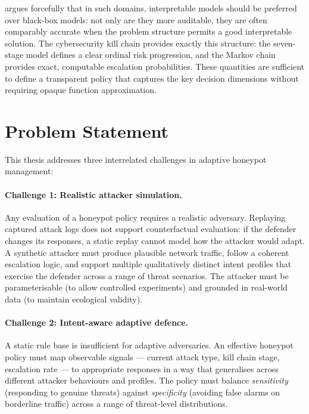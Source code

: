 \citet{rudin2019stop} argues forcefully that in such domains, interpretable
models should be preferred over black-box models: not only are they more
auditable, they are often comparably accurate when the problem structure
permits a good interpretable solution.
The cybersecurity kill chain provides exactly this structure: the seven-stage
model defines a clear ordinal risk progression, and the Markov chain provides
exact, computable escalation probabilities.
These quantities are sufficient to define a transparent policy that captures
the key decision dimensions without requiring opaque function approximation.

\section{Problem Statement}

This thesis addresses three interrelated challenges in adaptive honeypot
management:

\paragraph{Challenge 1: Realistic attacker simulation.}
Any evaluation of a honeypot policy requires a realistic adversary.
Replaying captured attack logs does not support counterfactual evaluation:
if the defender changes its responses, a static replay cannot model how the
attacker would adapt.
A synthetic attacker must produce plausible network traffic, follow a coherent
escalation logic, and support multiple qualitatively distinct intent profiles
that exercise the defender across a range of threat scenarios.
The attacker must be parameterisable (to allow controlled experiments) and
grounded in real-world data (to maintain ecological validity).

\paragraph{Challenge 2: Intent-aware adaptive defence.}
A static rule base is insufficient for adaptive adversaries.
An effective honeypot policy must map observable signals --- current attack
type, kill chain stage, escalation rate --- to appropriate responses in a
way that generalises across different attacker behaviours and profiles.
The policy must balance \emph{sensitivity} (responding to genuine threats)
against \emph{specificity} (avoiding false alarms on borderline traffic)
across a range of threat-level distributions.


